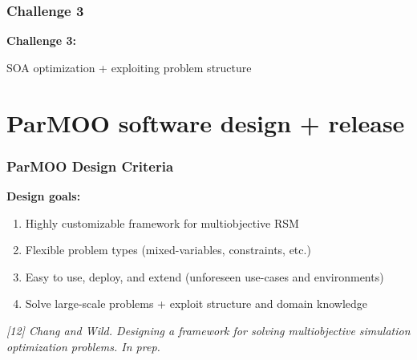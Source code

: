 \documentclass[aspectratio=169]{beamer}
\begin{document}
\begin{frame}
\medskip


\medskip

\end{frame}

\begin{frame}\frametitle{Challenge 3}
\vfill
\begin{center}
{\Huge \bf
Challenge 3:\\

\bigskip

SOA optimization + exploiting problem structure
}
\end{center}
\vfill
\end{frame}

\section{ParMOO software design + release}

\begin{frame}\frametitle{ParMOO Design Criteria}

{\large
\textbf{Design goals:}}

\medskip

\begin{enumerate}
\item Highly customizable framework for multiobjective RSM
\item Flexible problem types (mixed-variables, constraints, etc.)
\item Easy to use, deploy, and extend (unforeseen use-cases and environments)
\item Solve large-scale problems + exploit structure and domain knowledge
\end{enumerate}

\vfill

{\tiny\it
[12]
Chang and Wild.
Designing a framework for solving multiobjective simulation optimization problems.
In prep.
}
\end{frame}
\end{document}

